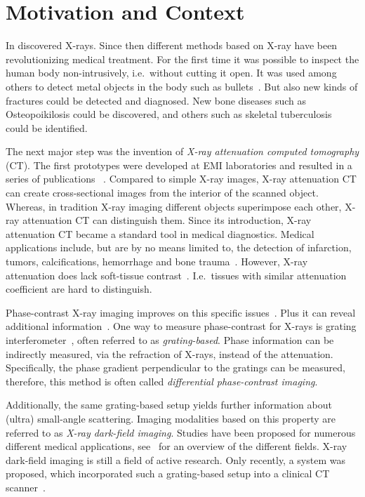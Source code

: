 \chapter{Motivation and Context}\label{chap:introduction}

In \citeyear{rontgen_uber_1895} \citeauthor{rontgen_uber_1895} discovered X-rays. Since then
different methods based on X-ray have been revolutionizing medical treatment. For the first time it
was possible to inspect the human body non-intrusively, i.e.\ without cutting it open. It was used
among others to detect metal objects in the body such as bullets~\cite{haygood_skeletal_1996}. But
also new kinds of fractures could be detected and diagnosed. New bone diseases such as
Osteopoikilosis could be discovered, and others such as skeletal
tuberculosis~\cite{haygood_skeletal_1996} could be identified.

The next major step was the invention of \textit{X-ray attenuation computed tomography} (CT). The
first prototypes were developed at EMI laboratories and resulted in a series of publications
~\cite{hounsfield_computerized_1973,ambrose_computerized_1973,perry_computerized_1973}. Compared to
simple X-ray images, X-ray attenuation CT can create cross-sectional images from the interior of the
scanned object. Whereas, in tradition X-ray imaging different objects superimpose each other, X-ray
attenuation CT can distinguish them. Since its introduction, X-ray attenuation CT became a standard
tool in medical diagnostics. Medical applications include, but are by no means limited to, the
detection of infarction, tumors, calcifications, hemorrhage and bone
trauma~\cite[Chapter~5]{buchanan_advanced_2012}. However, X-ray attenuation does lack soft-tissue
contrast~\cite{pfeiffer_phase_2006}. I.e.\ tissues with similar attenuation coefficient are hard to
distinguish.

Phase-contrast X-ray imaging improves on this specific issues~\cite{lewis_medical_2004}. Plus it can
reveal additional information~\cite{hahn_numerical_2012}. One way to measure phase-contrast for
X-rays is grating interferometer~\cite{pfeiffer_hard-x-ray_2008}, often referred to as
\textit{grating-based}. Phase information can be indirectly measured, via the refraction of X-rays,
instead of the attenuation. Specifically, the phase gradient perpendicular to the gratings can be
measured, therefore, this method is often called \textit{differential phase-contrast imaging}.

Additionally, the same grating-based setup yields further information about (ultra) small-angle
scattering. Imaging modalities based on this property are referred to as \textit{X-ray dark-field
	imaging}. Studies have been proposed for numerous different medical applications,
see~\cite[Chapter 1.3.1]{wieczorek_anisotropic_2017} for an overview of the different fields. X-ray
dark-field imaging is still a field of active research. Only recently, a system was proposed, which
incorporated such a grating-based setup into a clinical CT scanner~\cite{viermetz_dark-field_2022}.

